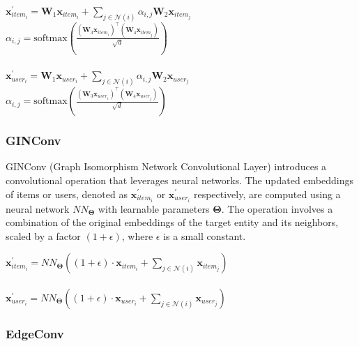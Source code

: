 \documentclass{scrartcl}
\begin{document}
\begin{center}
    $\mathbf{x}^{\prime}_{item_{i}} = \mathbf{W}_1 \mathbf{x}_{item_{i}} + \sum_{j \in \mathcal{N}(i)} \alpha_{i,j} \mathbf{W}_2 \mathbf{x}_{item_{j}}$ \\
    $\alpha_{i,j} = \textrm{softmax} \left( \frac{(\mathbf{W}_3\mathbf{x}_{item_{i}})^{\top} (\mathbf{W}_4\mathbf{x}_{item_{j}})} {\sqrt{d}} \right)$ \\~\\
    $\mathbf{x}^{\prime}_{user_{i}} = \mathbf{W}_1 \mathbf{x}_{user_{i}} + \sum_{j \in \mathcal{N}(i)} \alpha_{i,j} \mathbf{W}_2 \mathbf{x}_{user_{j}}$ \\
    $\alpha_{i,j} = \textrm{softmax} \left( \frac{(\mathbf{W}_3\mathbf{x}_{user_{i}})^{\top} (\mathbf{W}_4\mathbf{x}_{user_{j}})} {\sqrt{d}} \right)$ 
\end{center}

\subsubsection{GINConv\cite{ginconv}} 

\quad GINConv (Graph Isomorphism Network Convolutional Layer) introduces a convolutional operation that leverages neural networks. The updated embeddings of items or users, denoted as $\mathbf{x}^{\prime}_{item_i}$ or $\mathbf{x}^{\prime}_{user_i}$ respectively, are computed using a neural network $NN_{\mathbf{\Theta}}$ with learnable parameters $\mathbf{\Theta}$. The operation involves a combination of the original embeddings of the target entity and its neighbors, scaled by a factor $(1 + \epsilon)$, where $\epsilon$ is a small constant. \\ 

\begin{center}
    $\mathbf{x}^{\prime}_{item_{i}} = NN_{\mathbf{\Theta}} \left( (1 + \epsilon) \cdot \mathbf{x}_{item_{i}} + \sum_{j \in \mathcal{N}(i)} \mathbf{x}_{item_{j}} \right)$ \\~\\
    $\mathbf{x}^{\prime}_{user_{i}} = NN_{\mathbf{\Theta}} \left( (1 + \epsilon) \cdot \mathbf{x}_{user_{i}} + \sum_{j \in \mathcal{N}(i)} \mathbf{x}_{user_{j}} \right)$
\end{center}

\subsubsection{EdgeConv\cite{edgeconv}} 
\end{document}

